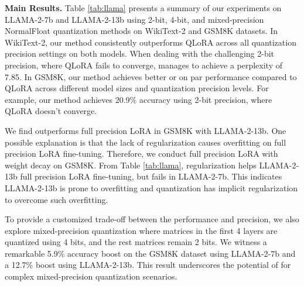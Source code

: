 \noindent \textbf{Main Results.} 
Table \ref{tab:llama} presents a summary of our experiments on LLAMA-2-7b and LLAMA-2-13b using 2-bit, 4-bit, and mixed-precision NormalFloat quantization methods on WikiText-2 and GSM8K datasets. In WikiText-2, our method consistently outperforms QLoRA across all quantization precision settings on both models. 
When dealing with the challenging 2-bit precision, where QLoRA fails to converge, {\OurAlg} manages to achieve a perplexity of 7.85. In GSM8K, our method achieves better or on par performance compared to QLoRA across different model sizes and quantization precision levels. For example, our method achieves 20.9\% accuracy using 2-bit precision, where QLoRA doesn't converge. 

We find {\OurAlg} outperforms full precision LoRA in GSM8K with LLAMA-2-13b. One possible explanation is that the lack of regularization causes overfitting on full precision LoRA fine-tuning. Therefore, we conduct full precision LoRA with weight decay on GSM8K. From Table \ref{tab:llama}, regularization helps LLAMA-2-13b full precision LoRA fine-tuning, but fails in LLAMA-2-7b. This indicates LLAMA-2-13b is prone to overfitting and quantization has implicit regularization to overcome such overfitting.

To provide a customized trade-off between the performance and precision, we also explore mixed-precision quantization where matrices in the first 4 layers are quantized using 4 bits, and the rest matrices remain 2 bits. We witness a remarkable 5.9\% accuracy boost on the GSM8K dataset using LLAMA-2-7b and a 12.7\% boost using LLAMA-2-13b. This result underscores the potential of {\OurAlg} for complex mixed-precision quantization scenarios.

